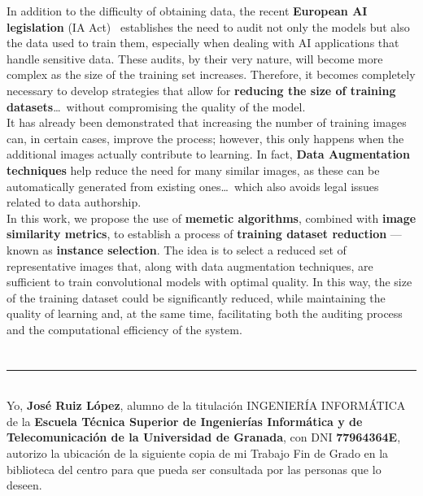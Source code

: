 In addition to the difficulty of obtaining data, the recent \textbf{European AI legislation}
(IA Act)~\cite{ReglamentoIA2024} establishes the need to audit not only the models but also the data used to train
them, especially when dealing with AI applications that handle sensitive data.
These audits, by their very nature, will become more complex as the size of the training set increases.
Therefore, it becomes completely necessary to develop strategies that allow for
\textbf{reducing the size of training datasets}\ldots\ without compromising the quality of the model. \\[6pt]

It has already been demonstrated that increasing the number of training images can, in certain cases, improve the
process; however, this only happens when the additional images actually contribute to learning.
In fact, \textbf{Data Augmentation techniques} help reduce the need for many similar images, as these can be
automatically generated from existing ones\ldots\ which also avoids legal issues related to data authorship. \\[6pt]

In this work, we propose the use of \textbf{memetic algorithms}, combined with \textbf{image similarity metrics}, to
establish a process of \textbf{training dataset reduction} — known as \textbf{instance selection}.
The idea is to select a reduced set of representative images that, along with data augmentation techniques, are
sufficient to train convolutional models with optimal quality.
In this way, the size of the training dataset could be significantly reduced, while maintaining the quality of
learning and, at the same time, facilitating both the auditing process and the computational efficiency of the system.
\\[6pt]

\chapter*{}
\thispagestyle{empty}

\noindent\rule[-1ex]{\textwidth}{2pt}\\[4.5ex]

Yo, \textbf{José Ruiz López}, alumno de la titulación INGENIERÍA INFORMÁTICA de la \textbf{Escuela Técnica Superior
       de Ingenierías Informática y de Telecomunicación de la Universidad de Granada}, con DNI \textbf{77964364E}, autorizo la
ubicación de la siguiente copia de mi Trabajo Fin de Grado en la biblioteca del centro para que pueda ser
consultada por las personas que lo deseen.

